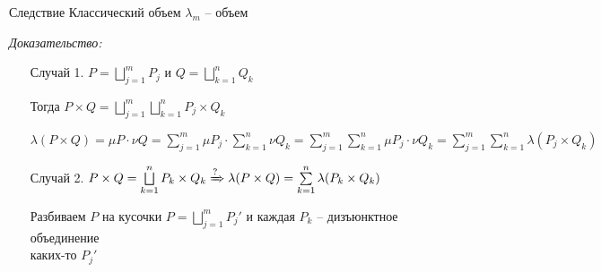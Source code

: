 \documentclass[12pt]{article}
\begin{document}
\begin{theo}{Следствие}
    Классический объем $\lambda_m$ -- объем
\end{theo}

\textit{Доказательство:}

\begin{itemize}
    \item[Случай 1.] $P = \bigsqcup\limits_{j = 1}^m P_j$ и $Q = \bigsqcup\limits_{k = 1}^n Q_k$
    
    Тогда $P \times Q = \bigsqcup\limits_{j = 1}^m \bigsqcup\limits_{k = 1}^n P_j \times Q_k$

    $\lambda(P \times Q) = \mu P \cdot \nu Q = \sum\limits_{j = 1}^m \mu P_j \cdot \sum\limits_{k = 1}^n \nu Q_k = \sum\limits_{j = 1}^m \sum\limits_{k = 1}^n \mu P_j \cdot \nu Q_k = \sum\limits_{j = 1}^m \sum\limits_{k = 1}^n \lambda(P_j \times Q_k)$

    \item[Случай 2.] $P \times Q = \bigsqcup\limits_{k = 1}^n P_k \times Q_k \xRightarrow[]{?} \lambda(P \times Q) = \sum\limits_{k = 1}^n \lambda(P_k \times Q_k)$
    
    Разбиваем $P$ на кусочки $P = \bigsqcup\limits_{j = 1}^m P_j'$ и каждая $P_k$ -- дизъюнктное объединение \\ каких-то $P_j'$
\end{itemize}
\end{document}
